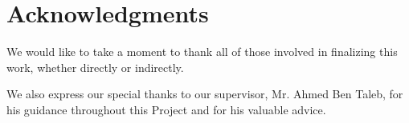 \section*{Acknowledgments}

We would like to take a moment to thank all of those involved in finalizing this work, whether directly or indirectly.

We also express our special thanks to our supervisor, Mr. Ahmed Ben Taleb, for his guidance throughout this Project and for his valuable advice.

\newpage
